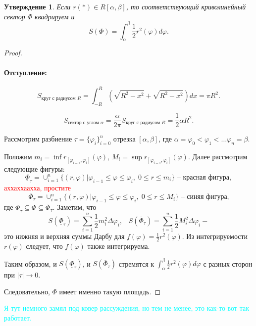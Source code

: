 \documentclass{article}
\theoremstyle{plain}
\newtheorem{claim}{Утверждение}
\theoremstyle{definition}
\theoremstyle{remark}
\renewcommand{\*}{\cdot}
\begin{document}
\begin{claim}
Если $r(*)\in R[\alpha, \beta]$, то соответствующий криволинейный сектор $\Phi$ квадрируем и $$S(\Phi) = \int_{\alpha}^{\beta}\frac{1}{2}r^2(\varphi)d\varphi.$$
\end{claim}
\begin{proof}

\paragraph{Отступление:} $$S_{\text{круг с радиусом }R} = \int_{-R}^R(\sqrt{R^2-x^2} + \sqrt{R^2-x^2})dx=\pi R^2 .$$

$$S_{\text{сектор с углом }\alpha} = \frac{\alpha}{2\pi}S_{\text{круг с радиусом }R} = \frac{1}{2}\alpha R^2.$$

Рассмотрим разбиение $\tau = \{\varphi_i\}_{i=0}^n$  отрезка $[\alpha, \beta]$, где $\alpha = \varphi_0<\varphi_1<\ldots \varphi_{n} =\beta$.

Положим $m_i = \inf r_{[\varphi_{i-1}, \varphi_i]}(\varphi)$, $M_i = \sup r_{[\varphi_{i-1}, \varphi_i]}(\varphi)$. Далее рассмотрим следующие фигуры: $$\displaystyle \underline{\Phi}_{\tau} = \cup_{i=1}^n\Big\{ (r, \varphi) \Big| \varphi_{i-1} \leq \varphi \leq \varphi_{i},\; 0\leq r\leq m_i \Big\} \text{ -- красная фигура},$$ \textcolor{red}{аххаххаахха, простите}
$$\displaystyle \overline{\Phi}_{\tau} = \cup_{i=1}^n\Big\{ (r, \varphi) \Big| \varphi_{i-1} \leq \varphi \leq \varphi_{i},\; 0\leq r\leq M_i \Big\} \text{ -- синяя фигура,}$$
где $\underline{\Phi}_{\tau} \subseteq \Phi \subseteq \overline{\Phi}_{\tau}$. Заметим, что $$S(\underline{\Phi}_{\tau}) = \sum_{i=1}^n \frac{1}{2}m_i^2\Delta\varphi_i,\;\;\;S(\overline{\Phi}_{\tau}) = \sum_{i=1}^n \frac{1}{2}M_i^2\Delta\varphi_i-$$
это нижняя и верхняя суммы Дарбу для $f(\varphi) = \frac{1}{2}r^2(\varphi)$. Из интегрируемости $r(\varphi)$ следует, что $f(\varphi)$ также интегрируема.

Таким образом, и  $\displaystyle S(\underline{\Phi}_{\tau})$, и $\displaystyle S(\overline{\Phi}_{\tau})$ стремятся к $\displaystyle \int_{\alpha} ^{\beta} \frac{1}{2}r^2(\varphi)d\varphi$ с разных сторон при $|\tau| \to 0$.

Следовательно, $\Phi$ имеет именно такую площадь.

\end{proof}


\textcolor{cyan}{Я тут немного замял под ковер рассуждения, но тем не менее, это как-то вот так работает.}
\end{document}
